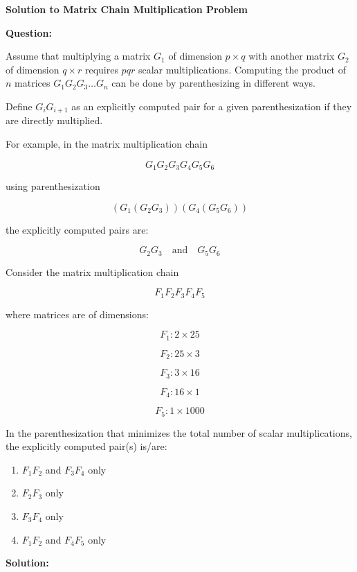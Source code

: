 \documentclass[12pt]{article}
\begin{document}
\begin{center}
    \Large \textbf{Solution to Matrix Chain Multiplication Problem}
\end{center}

\vspace{0.5cm}

\textbf{Question:}

Assume that multiplying a matrix $G_1$ of dimension $p \times q$ with another matrix $G_2$ of dimension $q \times r$ requires $pqr$ scalar multiplications. Computing the product of $n$ matrices $G_1G_2G_3 \dots G_n$ can be done by parenthesizing in different ways.

Define $G_iG_{i+1}$ as an explicitly computed pair for a given parenthesization if they are directly multiplied.

For example, in the matrix multiplication chain

\[
G_1G_2G_3G_4G_5G_6
\]

using parenthesization

\[
(G_1(G_2G_3))(G_4(G_5G_6))
\]

the explicitly computed pairs are:

\[
G_2G_3 \quad \text{and} \quad G_5G_6
\]

Consider the matrix multiplication chain

\[
F_1F_2F_3F_4F_5
\]

where matrices are of dimensions:

\[
F_1 : 2 \times 25
\]

\[
F_2 : 25 \times 3
\]

\[
F_3 : 3 \times 16
\]

\[
F_4 : 16 \times 1
\]

\[
F_5 : 1 \times 1000
\]

In the parenthesization that minimizes the total number of scalar multiplications, the explicitly computed pair(s) is/are:

\begin{enumerate}[label=(\Alph*)]
    \item $F_1F_2$ and $F_3F_4$ only
    \item $F_2F_3$ only
    \item $F_3F_4$ only
    \item $F_1F_2$ and $F_4F_5$ only
\end{enumerate}

\vspace{0.5cm}

\textbf{Solution:}
\end{document}
